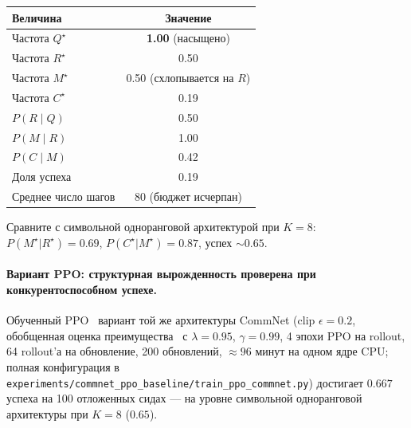 \documentclass{article}
\begin{document}
\begin{table}[h]
\centering
\small
\begin{tabular}{l c}
\toprule
Величина & Значение \\
\midrule
Частота $Q^\star$                           & \textbf{1.00} (насыщено) \\
Частота $R^\star$                           & 0.50 \\
Частота $M^\star$                           & 0.50 (схлопывается на $R$) \\
Частота $C^\star$                           & 0.19 \\
$P(R \mid Q)$                               & 0.50 \\
$P(M \mid R)$                               & 1.00 \\
$P(C \mid M)$                               & 0.42 \\
Доля успеха                                 & 0.19 \\
Среднее число шагов                         & 80 (бюджет исчерпан) \\
\bottomrule
\end{tabular}
\end{table}

Сравните с символьной одноранговой архитектурой при $K{=}8$: $P(M^\star|R^\star){=}0.69$, $P(C^\star|M^\star){=}0.87$, успех $\sim 0.65$.

\paragraph{Вариант PPO: структурная вырожденность проверена при конкурентоспособном успехе.}
Обученный PPO~\citep{schulman2017proximal} вариант той же архитектуры CommNet (clip $\epsilon{=}0.2$, обобщенная оценка преимущества~\citep{schulman2016gae} с $\lambda{=}0.95$, $\gamma{=}0.99$, 4 эпохи PPO на rollout, 64 rollout'а на обновление, 200 обновлений, $\approx 96$ минут на одном ядре CPU; полная конфигурация в \texttt{experiments/commnet\_ppo\_baseline/train\_ppo\_commnet.py}) достигает $0.667$ успеха на 100 отложенных сидах --- на уровне символьной одноранговой архитектуры при $K{=}8$ ($0.65$).
\end{document}
